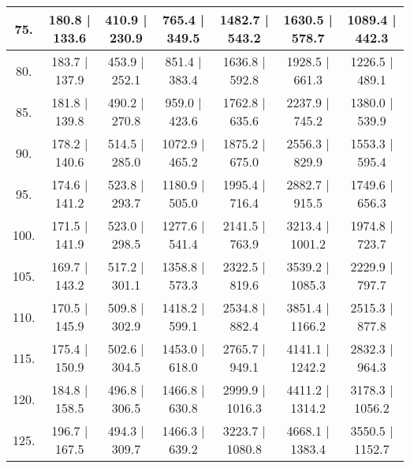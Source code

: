 \begin{tabular}{|c||c|c|c|c|c|c|}
\hline
  75. &    180.8 |   133.6 &    410.9 |   230.9 &    765.4 |   349.5 &   1482.7 |   543.2 &   1630.5 |   578.7 &   1089.4 |   442.3\tabularnewline
\hline
  80. &    183.7 |   137.9 &    453.9 |   252.1 &    851.4 |   383.4 &   1636.8 |   592.8 &   1928.5 |   661.3 &   1226.5 |   489.1\tabularnewline
\hline
  85. &    181.8 |   139.8 &    490.2 |   270.8 &    959.0 |   423.6 &   1762.8 |   635.6 &   2237.9 |   745.2 &   1380.0 |   539.9\tabularnewline
\hline
  90. &    178.2 |   140.6 &    514.5 |   285.0 &   1072.9 |   465.2 &   1875.2 |   675.0 &   2556.3 |   829.9 &   1553.3 |   595.4\tabularnewline
\hline
  95. &    174.6 |   141.2 &    523.8 |   293.7 &   1180.9 |   505.0 &   1995.4 |   716.4 &   2882.7 |   915.5 &   1749.6 |   656.3\tabularnewline
\hline
 100. &    171.5 |   141.9 &    523.0 |   298.5 &   1277.6 |   541.4 &   2141.5 |   763.9 &   3213.4 |  1001.2 &   1974.8 |   723.7\tabularnewline
\hline
 105. &    169.7 |   143.2 &    517.2 |   301.1 &   1358.8 |   573.3 &   2322.5 |   819.6 &   3539.2 |  1085.3 &   2229.9 |   797.7\tabularnewline
\hline
 110. &    170.5 |   145.9 &    509.8 |   302.9 &   1418.2 |   599.1 &   2534.8 |   882.4 &   3851.4 |  1166.2 &   2515.3 |   877.8\tabularnewline
\hline
 115. &    175.4 |   150.9 &    502.6 |   304.5 &   1453.0 |   618.0 &   2765.7 |   949.1 &   4141.1 |  1242.2 &   2832.3 |   964.3\tabularnewline
\hline
 120. &    184.8 |   158.5 &    496.8 |   306.5 &   1466.8 |   630.8 &   2999.9 |  1016.3 &   4411.2 |  1314.2 &   3178.3 |  1056.2\tabularnewline
\hline
 125. &    196.7 |   167.5 &    494.3 |   309.7 &   1466.3 |   639.2 &   3223.7 |  1080.8 &   4668.1 |  1383.4 &   3550.5 |  1152.7\tabularnewline
\hline
\end{tabular}
